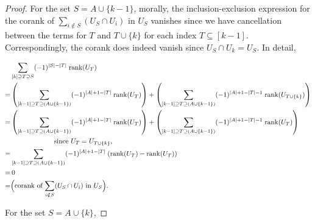 \documentclass[a4paper]{amsart}
\numberwithin{theoremcounter}{section}
\theoremstyle{definition}
\theoremstyle{remark}
\newcommand{\mr}[1]{{\rm #1}}
\newcommand{\rank}{\mr{rank}}
\begin{document}
\begin{proof}
 For the set $S =A \cup \{k-1\}$, morally, the inclusion-exclusion expression for the corank of $\sum_{i \notin S} (U_S \cap U_i) $ in $U_S$ vanishes since we have cancellation between the terms for $T$ and $T \cup \{k\}$ for each index $T \subseteq [k-1]$. Correspondingly, the corank does indeed vanish since  $U_S \cap U_k = U_S$. In detail, 
 

 \begin{align*}
& \sum_{[k] \supseteq T\supseteq S} (-1)^{|S|-|T|} \; \rank(U_T) \\ 
 = &  \left( \sum_{[k-1] \supseteq T\supseteq (A  \cup \{k-1\})} (-1)^{|A|+1-|T|} \; \rank(U_{T}) \right) + \left( \sum_{[k-1] \supseteq T\supseteq (A  \cup \{k-1\})} (-1)^{|A|+1-|T|-1} \; \rank(U_{T\cup \{k\}}) \right)  \\ 
  = &  \left( \sum_{[k-1] \supseteq T\supseteq (A  \cup \{k-1\})} (-1)^{|A|+1-|T|} \; \rank(U_{T}) \right) + \left( \sum_{[k-1] \supseteq T\supseteq (A  \cup \{k-1\})} (-1)^{|A|+1-|T|-1} \; \rank(U_{T}) \right)  \\ & \qquad \qquad \qquad  \text{ since $U_T = U_{T\cup \{k\} }$, } \\ 
    = &   \sum_{[k-1] \supseteq T\supseteq (A  \cup \{k-1\})} (-1)^{|A|+1-|T|} \; ( \rank(U_{T}) - \rank(U_T) )\\
    =&\, 0 \\
    =& \Big(\text{corank of $\sum_{i \notin S} (U_S \cap U_i) $ in $U_S$}\Big).
 \end{align*}

 
  For the set $S = A \cup \{k\}$,  
  

\end{proof}
\end{document}
